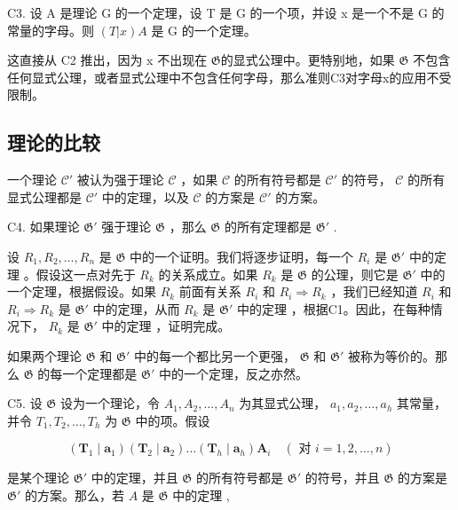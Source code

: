 C3. 设 A 是理论 G 的一个定理，设 T 是 G 的一个项，并设 x 是一个不是 G 的常量的字母。则 \((T|x)A\) 是 G 的一个定理。

这直接从 C2 推出，因为 x 不出现在 \(\mathfrak{G}\)的显式公理中。更特别地，如果 \(\mathfrak{G}\) 不包含任何显式公理，或者显式公理中不包含任何字母，那么准则C3对字母x的应用不受限制。

\subsection{理论的比较}

一个理论 \(\mathcal{C}'\) 被认为强于理论 \(\mathcal{C}\) ，如果 \(\mathcal{C}\) 的所有符号都是 \(\mathcal{C}'\) 的符号， \(\mathcal{C}\) 的所有显式公理都是 \(\mathcal{C}'\) 中的定理，以及 \(\mathcal{C}\) 的方案是 \(\mathcal{C}'\) 的方案。

C4. 如果理论 \(\mathfrak{G}'\) 强于理论 \(\mathfrak{G}\) ，那么 \(\mathfrak{G}\) 的所有定理都是 \(\mathfrak{G}'\) .

设 \(R_1, R_2, \ldots, R_n\) 是 \(\mathfrak{G}\) 中的一个证明。我们将逐步证明，每一个 \(R_i\) 是 \(\mathfrak{G}'\) 中的定理 。假设这一点对先于 \(R_k\) 的关系成立。如果 \(R_k\) 是 \(\mathfrak{G}\) 的公理，则它是 \(\mathfrak{G}'\) 中的一个定理，根据假设。如果 \(R_k\) 前面有关系 \(R_i\) 和 \(R_i \Longrightarrow R_k\) ，我们已经知道 \(R_i\) 和 \(R_i \Longrightarrow R_k\) 是 \(\mathfrak{G}'\) 中的定理，从而 \(R_k\) 是 \(\mathfrak{G}'\) 中的定理 ，根据C1。因此，在每种情况下， \(R_k\) 是 \(\mathfrak{G}'\) 中的定理 ，证明完成。

如果两个理论 \(\mathfrak{G}\) 和 \(\mathfrak{G}'\) 中的每一个都比另一个更强， \(\mathfrak{G}\) 和 \(\mathfrak{G}'\) 被称为等价的。那么 \(\mathfrak{G}\) 的每一个定理都是 \(\mathfrak{G}'\) 中的一个定理，反之亦然。

C5. 设 \(\mathfrak{G}\) 设为一个理论，令 \(A_{1}, A_{2}, \ldots, A_{n}\) 为其显式公理， \(a_{1}, a_{2}, \ldots, a_{h}\) 其常量，并令 \(T_{1}, T_{2}, \ldots, T_{h}\) 为 \(\mathfrak{G}\) 中的项。假设

\[
\left(\boldsymbol {T} _ {1} \mid \boldsymbol {a} _ {1}\right) \left(\boldsymbol {T} _ {2} \mid \boldsymbol {a} _ {2}\right) \dots \left(\boldsymbol {T} _ {h} \mid \boldsymbol {a} _ {h}\right) \boldsymbol {A} _ {i} \quad (\text { 对 } i = 1, 2, \dots , n)
\]

是某个理论 \(\mathfrak{G}'\) 中的定理，并且 \(\mathfrak{G}\) 的所有符号都是 \(\mathfrak{G}'\) 的符号，并且 \(\mathfrak{G}\) 的方案是 \(\mathfrak{G}'\) 的方案。那么，若 \(A\) 是 \(\mathfrak{G}\) 中的定理 ,

